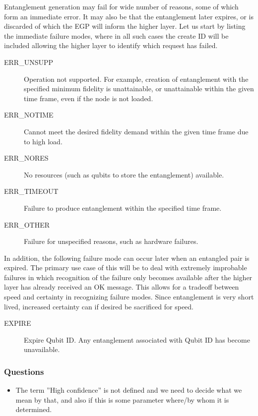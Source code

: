 \documentclass{article}
\begin{document}
Entanglement generation may fail for wide number of reasons, some of which form an immediate error. It may also be that the entanglement later expires, or is discarded
of which the EGP will inform the higher layer. Let us start by listing the immediate failure modes, where in all such cases the create ID will be included allowing the
higher layer to identify which request has failed.\\
\begin{description}
\item[ERR\_UNSUPP] Operation not supported. For example, creation of entanglement with the specified minimum fidelity is unattainable, or 
unattainable within the given time frame, even if the node is not loaded. 
\item[ERR\_NOTIME] Cannot meet the desired fidelity demand within the given time frame due to high load.
\item[ERR\_NORES] No resources (such as qubits to store the entanglement) available.
\item[ERR\_TIMEOUT] Failure to produce entanglement within the specified time frame.
\item[ERR\_OTHER] Failure for unspecified reasons, such as hardware failures.
\end{description}
In addition, the following failure mode can occur later when an entangled pair is expired. The primary use case of this will be to deal with extremely improbable failures
in which recognition of the failure only becomes available after the higher layer has already received an OK message. This allows for 
a tradeoff between speed and certainty in recognizing failure modes. Since entanglement is very short lived, increased certainty can if desired be sacrificed for speed.
\begin{description}
\item[EXPIRE] Expire Qubit ID. Any entanglement associated with Qubit ID has become unavailable.
\end{description}

\subsubsection{Questions}
\begin{itemize}
\item The term ''High confidence'' is not defined and we need to decide what we mean by that, and also if this is some parameter where/by whom it is determined.
\end{itemize}
\end{document}
